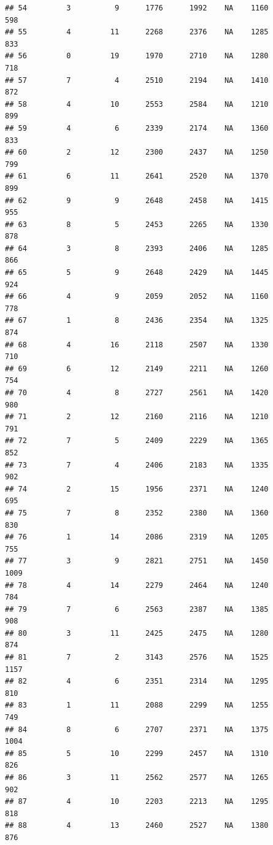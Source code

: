 \documentclass[]{book}
\begin{document}
\begin{verbatim}
## 54         3          9      1776      1992    NA    1160            598
## 55         4         11      2268      2376    NA    1285            833
## 56         0         19      1970      2710    NA    1280            718
## 57         7          4      2510      2194    NA    1410            872
## 58         4         10      2553      2584    NA    1210            899
## 59         4          6      2339      2174    NA    1360            833
## 60         2         12      2300      2437    NA    1250            799
## 61         6         11      2641      2520    NA    1370            899
## 62         9          9      2648      2458    NA    1415            955
## 63         8          5      2453      2265    NA    1330            878
## 64         3          8      2393      2406    NA    1285            866
## 65         5          9      2648      2429    NA    1445            924
## 66         4          9      2059      2052    NA    1160            778
## 67         1          8      2436      2354    NA    1325            874
## 68         4         16      2118      2507    NA    1330            710
## 69         6         12      2149      2211    NA    1260            754
## 70         4          8      2727      2561    NA    1420            980
## 71         2         12      2160      2116    NA    1210            791
## 72         7          5      2409      2229    NA    1365            852
## 73         7          4      2406      2183    NA    1335            902
## 74         2         15      1956      2371    NA    1240            695
## 75         7          8      2352      2380    NA    1360            830
## 76         1         14      2086      2319    NA    1205            755
## 77         3          9      2821      2751    NA    1450           1009
## 78         4         14      2279      2464    NA    1240            784
## 79         7          6      2563      2387    NA    1385            908
## 80         3         11      2425      2475    NA    1280            874
## 81         7          2      3143      2576    NA    1525           1157
## 82         4          6      2351      2314    NA    1295            810
## 83         1         11      2088      2299    NA    1255            749
## 84         8          6      2707      2371    NA    1375           1004
## 85         5         10      2299      2457    NA    1310            826
## 86         3         11      2562      2577    NA    1265            902
## 87         4         10      2203      2213    NA    1295            818
## 88         4         13      2460      2527    NA    1380            876

\end{verbatim}
\end{document}
